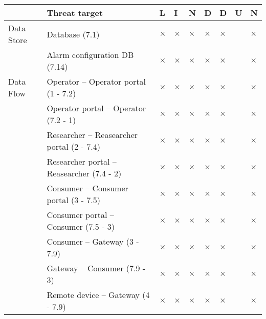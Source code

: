 

\begin{longtable}{p{2.3cm} p{9cm} p{0.2cm} p{0.2cm} p{0.2cm} p{0.2cm}p{0.2cm} p{0.2cm} p{0.2cm} }
\hline\hline
& Threat target & L & I & N & D & D & U & N \\
\hline
Data Store &  Database (7.1) & $\times$ & $\times$ & $\times$ & $\times$ & $\times$ &  & $\times$ \\
	   &  Alarm configuration DB (7.14) & $\times$ & $\times$ & $\times$ & $\times$ & $\times$ &  & $\times$ \\
\hline
Data Flow  &  Operator -- Operator portal (1 - 7.2) & $\times$ & $\times$ & $\times$& $\times$ &  $\times$ & & $\times$\\
		   &  Operator portal -- Operator (7.2 - 1) & $\times$ & $\times$ & $\times$& $\times$ &  $\times$ & & $\times$\\
		   &  Researcher -- Reasearcher portal (2 - 7.4) & $\times$ & $\times$ & $\times$& $\times$ &  $\times$ & & $\times$\\
		   &  Researcher portal -- Reasearcher (7.4 - 2) & $\times$ & $\times$ & $\times$& $\times$ &  $\times$ & & $\times$\\
		   &  Consumer -- Consumer portal (3 - 7.5) & $\times$ & $\times$ & $\times$& $\times$ &  $\times$ & & $\times$\\
		   &  Consumer portal -- Consumer (7.5 - 3) & $\times$ & $\times$ & $\times$& $\times$ &  $\times$ & & $\times$\\
		   &  Consumer -- Gateway (3 - 7.9) & $\times$ & $\times$ & $\times$& $\times$ &  $\times$ & & $\times$\\
		   &  Gateway -- Consumer (7.9 - 3) & $\times$ & $\times$ & $\times$& $\times$ &  $\times$ & & $\times$\\
		   &  Remote device -- Gateway (4 - 7.9) & $\times$ & $\times$ & $\times$& $\times$ &  $\times$ & & $\times$\\

\end{longtable}

